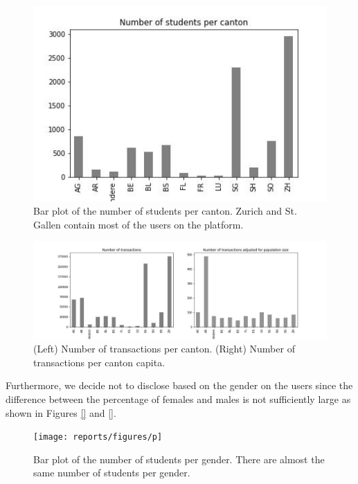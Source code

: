\documentclass[sigplan,screen]{acmart}
\begin{document}
\begin{figure}
    \centering
    \includegraphics[width=\linewidth]{reports/figures/num_per_canton.jpg}
    \caption{Bar plot of the number of students per canton. Zurich and St. Gallen contain most of the users on the platform.}
    \label{fig:my_label}
\end{figure}

\begin{figure}[!ht]
    \centering
    \includegraphics[width=\linewidth]{reports/figures/cantonal_representation.jpg}
    \caption{(Left) Number of transactions per canton. (Right) Number of transactions per canton capita.}
    \label{fig:cantonal_representation}
\end{figure}

Furthermore, we decide not to disclose based on the gender on the users since the difference between the percentage of females and males is not sufficiently large as shown in Figures \ref{} and \ref{}.

\begin{figure}
    \centering
    \texttt{[image: reports/figures/p]}
    \caption{Bar plot of the number of students per gender. There are almost the same number of students per gender.}
    \label{fig:my_label}
\end{figure}
\end{document}
